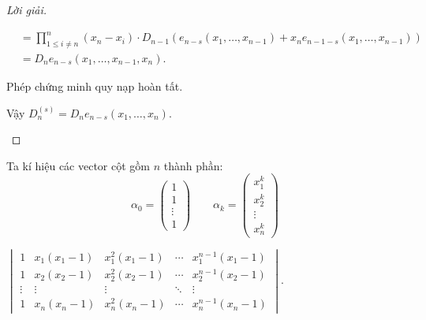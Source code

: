 \documentclass[class=nhvh-linear-algebra,crop=false]{standalone}
\begin{document}
\begin{proof}[Lời giải]
\begin{enumerate}[label = (\alph*)]
\begin{align*}
			       & = \prod^{n}_{1\le i\ne n}(x_{n} - x_{i})\cdot D_{n-1} \left( e_{n-s}(x_{1}, \ldots, x_{n-1}) + x_{n}e_{n-1-s}(x_{1}, \ldots, x_{n-1}) \right)       \\
			       & = D_{n} e_{n-s}(x_{1}, \ldots, x_{n-1}, x_{n}).
		      \end{align*}
		      \par Phép chứng minh quy nạp hoàn tất.
		      \par Vậy $D^{(s)}_{n} = D_{n}e_{n-s}(x_{1}, \ldots, x_{n})$.
	\end{enumerate}
\end{proof}

\par Ta kí hiệu các vector cột gồm $n$ thành phần:
\[
	\alpha_{0} = \begin{pmatrix}
		1 \\ 1 \\ \vdots \\ 1
	\end{pmatrix}\qquad
	\alpha_{k} = \begin{pmatrix}
		x_{1}^{k} \\ x_{2}^{k} \\ \vdots \\ x_{n}^{k}
	\end{pmatrix}
\]

\begin{exercise}
	$\begin{vmatrix}
			1      & x_{1}(x_{1} - 1) & x_{1}^{2}(x_{1} - 1) & \cdots & x_{1}^{n-1}(x_{1} - 1) \\
			1      & x_{2}(x_{2} - 1) & x_{2}^{2}(x_{2} - 1) & \cdots & x_{2}^{n-1}(x_{2} - 1) \\
			\vdots & \vdots           & \vdots               & \ddots & \vdots                 \\
			1      & x_{n}(x_{n} - 1) & x_{n}^{2}(x_{n} - 1) & \cdots & x_{n}^{n-1}(x_{n} - 1)
		\end{vmatrix}$.
\end{exercise}
\end{document}
